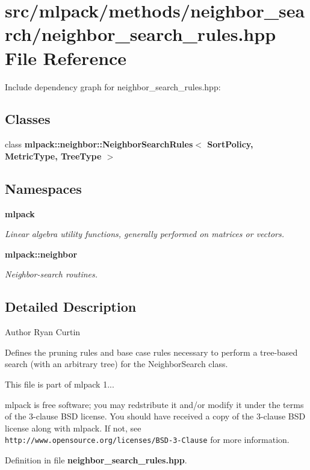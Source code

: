\section{src/mlpack/methods/neighbor\-\_\-search/neighbor\-\_\-search\-\_\-rules.hpp File Reference}
\label{neighbor__search__rules_8hpp}
Include dependency graph for neighbor\-\_\-search\-\_\-rules.\-hpp\-:
\subsection*{Classes}
\begin{DoxyCompactItemize}
\item 
class {\bf mlpack\-::neighbor\-::\-Neighbor\-Search\-Rules$<$ Sort\-Policy, Metric\-Type, Tree\-Type $>$}
\end{DoxyCompactItemize}
\subsection*{Namespaces}
\begin{DoxyCompactItemize}
\item 
{\bf mlpack}
\begin{DoxyCompactList}\small\item\em Linear algebra utility functions, generally performed on matrices or vectors. \end{DoxyCompactList}\item 
{\bf mlpack\-::neighbor}
\begin{DoxyCompactList}\small\item\em Neighbor-\/search routines. \end{DoxyCompactList}\end{DoxyCompactItemize}


\subsection{Detailed Description}
\begin{DoxyAuthor}{Author}
Ryan Curtin
\end{DoxyAuthor}
Defines the pruning rules and base case rules necessary to perform a tree-\/based search (with an arbitrary tree) for the Neighbor\-Search class.

This file is part of mlpack 1...

mlpack is free software; you may redstribute it and/or modify it under the terms of the 3-\/clause B\-S\-D license. You should have received a copy of the 3-\/clause B\-S\-D license along with mlpack. If not, see {\tt http\-://www.\-opensource.\-org/licenses/\-B\-S\-D-\/3-\/\-Clause} for more information. 

Definition in file {\bf neighbor\-\_\-search\-\_\-rules.\-hpp}.

